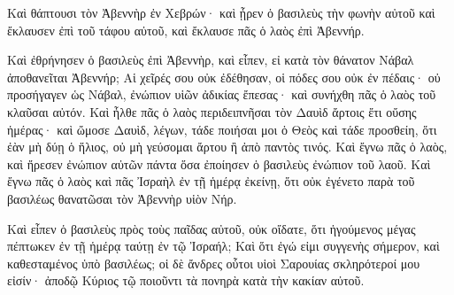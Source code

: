 {Καὶ θάπτουσι τὸν Ἀβεννὴρ ἐν Χεβρών· καὶ ᾖρεν ὁ βασιλεὺς τὴν φωνὴν αὐτοῦ καὶ ἔκλαυσεν ἐπὶ τοῦ τάφου αὐτοῦ, καὶ ἔκλαυσε πᾶς ὁ λαὸς ἐπὶ Ἀβεννήρ.
\par }{\PP {}Καὶ ἐθρήνησεν ὁ βασιλεὺς ἐπὶ Ἀβεννὴρ, καὶ εἶπεν, εἰ κατὰ τὸν θάνατον Νάβαλ ἀποθανεῖται Ἀβεννήρ;
Αἱ χεῖρές σου οὐκ ἐδέθησαν, οἱ πόδες σου οὐκ ἐν πέδαις· οὐ προσήγαγεν ὡς Νάβαλ, ἐνώπιον υἱῶν ἀδικίας ἔπεσας· καὶ συνήχθη πᾶς ὁ λαὸς τοῦ κλαῦσαι αὐτόν.
Καὶ ἦλθε πᾶς ὁ λαὸς περιδειπνῆσαι τὸν Δαυὶδ ἄρτοις ἔτι οὔσης ἡμέρας· καὶ ὤμοσε Δαυὶδ, λέγων, τάδε ποιήσαι μοι ὁ Θεὸς καὶ τάδε προσθείη, ὅτι ἐὰν μὴ δύῃ ὁ ἥλιος, οὐ μὴ γεύσομαι ἄρτου ἢ ἀπὸ παντὸς τινός.
Καὶ ἔγνω πᾶς ὁ λαὸς, καὶ ἤρεσεν ἐνώπιον αὐτῶν πάντα ὅσα ἐποίησεν ὁ βασιλεὺς ἐνώπιον τοῦ λαοῦ.
Καὶ ἔγνω πᾶς ὁ λαὸς καὶ πᾶς Ἰσραὴλ ἐν τῇ ἡμέρᾳ ἐκείνῃ, ὅτι οὐκ ἐγένετο παρὰ τοῦ βασιλέως θανατῶσαι τὸν Ἀβεννὴρ υἱὸν Νήρ.
\par }{\PP {}Καὶ εἶπεν ὁ βασιλεὺς πρὸς τοὺς παῖδας αὐτοῦ, οὐκ οἴδατε, ὅτι ἡγούμενος μέγας πέπτωκεν ἐν τῇ ἡμέρᾳ ταύτῃ ἐν τῷ Ἰσραήλ;
Καὶ ὅτι ἐγώ εἰμι συγγενὴς σήμερον, καὶ καθεσταμένος ὑπὸ βασιλέως; οἱ δὲ ἄνδρες οὗτοι υἱοὶ Σαρουίας σκληρότεροί μου εἰσίν· ἀποδῷ Κύριος τῷ ποιοῦντι τὰ πονηρὰ κατὰ τὴν κακίαν αὐτοῦ.

}
